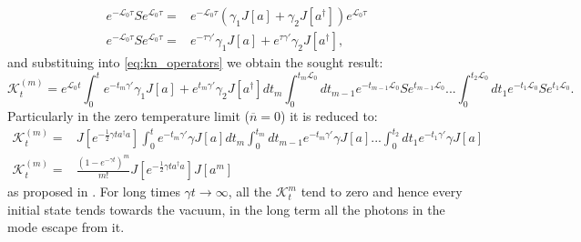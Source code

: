\begin{align}
  e^{-\mathcal{L}_{0}\tau}Se^{\mathcal{L}_{0}\tau} =& e^{-\mathcal{L}_{0}\tau}\left(\gamma_{1}J[a]+\gamma_{2}J[a^{\dagger}] \right)e^{\mathcal{L}_{0}\tau}\\
 e^{-\mathcal{L}_{0}\tau}Se^{\mathcal{L}_{0}\tau} =& e^{-\tau\gamma'}\gamma_{1}J[a]+e^{\tau\gamma'}\gamma_{2}J[a^{\dagger}],
\end{align}
and substituing into \eqref{eq:kn_operators} we obtain the sought result:
\begin{equation}
\mathcal{K}_{t}^{(m)}=e^{\mathcal{L}_{0}t}\int_{0}^{t}e^{-t_{m}\gamma'}\gamma_{1}J[a]+e^{t_{m}\gamma'}\gamma_{2}J[a^{\dagger}]dt_{m}\int_{0}^{t_{m}\mathcal{L}_{0}}dt_{m-1}e^{-t_{m-1}\mathcal{L}_{0}}Se^{t_{m-1}\mathcal{L}_{0}}...\int_{0}^{t_{2}\mathcal{L}_{0}}dt_{1}e^{-t_{1}\mathcal{L}_{0}}Se^{t_{1}\mathcal{L}_{0}}.
\end{equation}
Particularly in the zero temperature limit ($\overline{n}=0$) it is reduced to:
\begin{align}
\mathcal{K}_{t}^{(m)}=&J[e^{-\frac{1}{2}\gamma t a^{\dagger}a}]\int_{0}^{t}e^{-t_{m}\gamma'}\gamma J[a]dt_{m}\int_{0}^{t_{m}}dt_{m-1}e^{-t_{m}\gamma'}\gamma J[a]...\int_{0}^{t_{2}}dt_{1}e^{-t_{1}\gamma'}\gamma J[a]\\
\mathcal{K}_{t}^{(m)}=& \frac{(1-e^{-\gamma t})^{m}}{m!}J[e^{-\frac{1}{2}\gamma t a^{\dagger}a}]J[a^{m}]
\end{align}
as proposed in \cite{wiseman_quantum_2010,adesso_optimal_2009}. For long times $\gamma t \to \infty$, all the $\mathcal{K}^{m}_{t}$ tend to zero
and hence every initial state tends towards the vacuum, in the long term all the photons in the mode escape from it.
